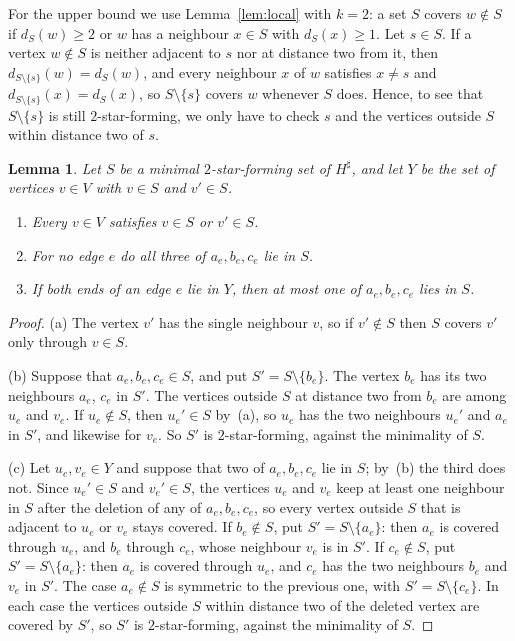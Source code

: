 \documentclass[11pt]{amsart}
\newtheorem{lemma}[theorem]{Lemma}
\theoremstyle{definition}
\theoremstyle{remark}
\begin{document}
For the upper bound we use Lemma~\ref{lem:local} with $k=2$: a set $S$ covers $w\notin S$ if $d_S(w)\ge2$ or $w$ has a neighbour $x\in S$ with $d_S(x)\ge1$. Let $s\in S$. If a vertex $w\notin S$ is neither adjacent to $s$ nor at distance two from it, then $d_{S\setminus\{s\}}(w)=d_S(w)$, and every neighbour $x$ of $w$ satisfies $x\ne s$ and $d_{S\setminus\{s\}}(x)=d_S(x)$, so $S\setminus\{s\}$ covers $w$ whenever $S$ does. Hence, to see that $S\setminus\{s\}$ is still $2$-star-forming, we only have to check $s$ and the vertices outside $S$ within distance two of $s$.

\begin{lemma}\label{lem:Ssharp}
Let $S$ be a minimal $2$-star-forming set of $H^\sharp$, and let $Y$ be the set of vertices $v\in V$ with $v\in S$ and $v'\in S$.
\begin{enumerate}
\item[(a)] Every $v\in V$ satisfies $v\in S$ or $v'\in S$.
\item[(b)] For no edge $e$ do all three of $a_e,b_e,c_e$ lie in $S$.
\item[(c)] If both ends of an edge $e$ lie in $Y$, then at most one of $a_e,b_e,c_e$ lies in $S$.
\end{enumerate}
\end{lemma}

\begin{proof}
(a) The vertex $v'$ has the single neighbour $v$, so if $v'\notin S$ then $S$ covers $v'$ only through $v\in S$.

(b) Suppose that $a_e,b_e,c_e\in S$, and put $S'=S\setminus\{b_e\}$. The vertex $b_e$ has its two neighbours $a_e$, $c_e$ in $S'$. The vertices outside $S$ at distance two from $b_e$ are among $u_e$ and $v_e$. If $u_e\notin S$, then $u_e'\in S$ by~(a), so $u_e$ has the two neighbours $u_e'$ and $a_e$ in $S'$, and likewise for $v_e$. So $S'$ is $2$-star-forming, against the minimality of $S$.

(c) Let $u_e,v_e\in Y$ and suppose that two of $a_e,b_e,c_e$ lie in $S$; by~(b) the third does not. Since $u_e'\in S$ and $v_e'\in S$, the vertices $u_e$ and $v_e$ keep at least one neighbour in $S$ after the deletion of any of $a_e,b_e,c_e$, so every vertex outside $S$ that is adjacent to $u_e$ or $v_e$ stays covered. If $b_e\notin S$, put $S'=S\setminus\{a_e\}$: then $a_e$ is covered through $u_e$, and $b_e$ through $c_e$, whose neighbour $v_e$ is in $S'$. If $c_e\notin S$, put $S'=S\setminus\{a_e\}$: then $a_e$ is covered through $u_e$, and $c_e$ has the two neighbours $b_e$ and $v_e$ in $S'$. The case $a_e\notin S$ is symmetric to the previous one, with $S'=S\setminus\{c_e\}$. In each case the vertices outside $S$ within distance two of the deleted vertex are covered by $S'$, so $S'$ is $2$-star-forming, against the minimality of $S$.
\end{proof}
\end{document}
